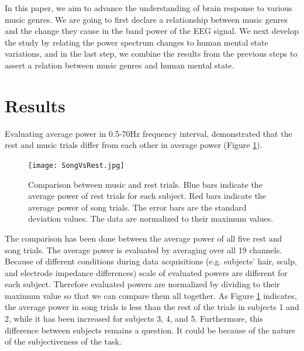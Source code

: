 \documentclass[9pt,twocolumn]{paper-template}
\begin{document}
In this paper, we aim to advance the understanding of brain response to various music genres. We are going to first declare a relationship between music genres and the change they cause in the band power of the EEG signal. We next develop the study by relating the power spectrum changes to human mental state variations, and in the last step, we combine the results from the previous steps to assert a relation between music genres and human mental state.
\section*{Results}
Evaluating average power in 0.5-70Hz frequency interval, demonstrated that the rest and music trials differ from each other in average power (Figure \ref{fig:SongVsRest}). \\
\begin{figure}[h!]
	\centering
	\texttt{[image: SongVsRest.jpg]}
 	\caption{Comparison between music and rest trials. Blue bars indicate the average power of rest trials for each subject. Red bars indicate the average power of song trials. The error bars are the standard deviation values. The data are normalized to their maximum values.}
  	\label{fig:SongVsRest}
\end{figure}

The comparison has been done between the average power of all five rest and song trials. The average power is evaluated by averaging over all 19 channels. Because of different conditions during data acquisitions (e.g. subjects' hair, scalp, and electrode impedance differences) scale of evaluated powers are different for each subject. Therefore evaluated powers are normalized by dividing to their maximum value so that we can compare them all together. As Figure \ref{fig:SongVsRest} indicates, the average power in song trials is less than the rest of the trials in subjects 1 and 2, while it has been increased for subjects 3, 4, and 5. Furthermore, this difference between subjects remains a question. It could be because of the nature of the subjectiveness of the task. \\
\end{document}

